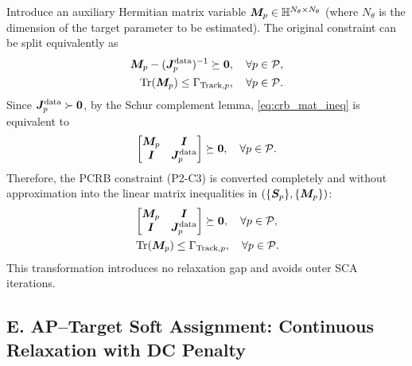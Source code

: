 Introduce an auxiliary Hermitian matrix variable $\bm{M}_p \in \mathbb{H}^{N_\theta \times N_\theta}$ (where $N_\theta$ is the dimension of the target parameter to be estimated). The original constraint can be split equivalently as
\begin{subequations}\label{eq:crb_decouple}
\begin{align}
\bm{M}_p - (\bm{J}_p^{\text{data}})^{-1} \succeq \bm{0}, \quad \forall p \in \mathcal{P}, \label{eq:crb_mat_ineq} \\
\operatorname{Tr}(\bm{M}_p) \leq \Gamma_{\text{Track},p}, \quad \forall p \in \mathcal{P}. \label{eq:crb_trace_ineq}
\end{align}
\end{subequations}
Since $\bm{J}_p^{\text{data}} \succ \bm{0}$, by the Schur complement lemma, \eqref{eq:crb_mat_ineq} is equivalent to
\begin{equation}\label{eq:crb_lmi}
\begin{bmatrix} \bm{M}_p & \bm{I} \\ \bm{I} & \bm{J}_p^{\text{data}} \end{bmatrix} \succeq \bm{0}, \quad \forall p \in \mathcal{P}.
\end{equation}
Therefore, the PCRB constraint (P2-C3) is converted completely and without approximation into the linear matrix inequalities in $(\{\bm{S}_p\}, \{\bm{M}_p\})$:
\begin{subequations}\label{eq:crb_lmi_final}
\begin{align}
& \begin{bmatrix} \bm{M}_p & \bm{I} \\ \bm{I} & \bm{J}_p^{\text{data}} \end{bmatrix} \succeq \bm{0}, \quad \forall p \in \mathcal{P}, \label{eq:crb_lmi_final_a} \\
& \operatorname{Tr}(\bm{M}_p) \leq \Gamma_{\text{Track},p}, \quad \forall p \in \mathcal{P}. \label{eq:crb_lmi_final_b}
\end{align}
\end{subequations}
This transformation introduces no relaxation gap and avoids outer SCA iterations.

\subsection*{E. AP--Target Soft Assignment: Continuous Relaxation with DC Penalty}

